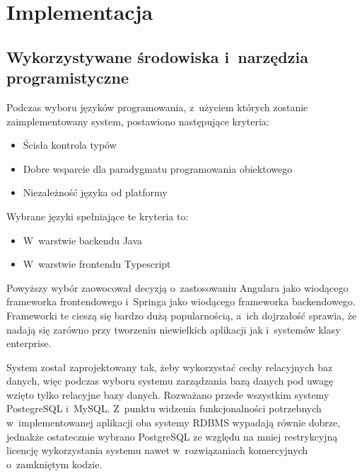 \chapter{Implementacja}\label{ch:implementation}
\section{Wykorzystywane środowiska i~narzędzia programistyczne}\label{sec:dev-tools}
Podczas wyboru języków programowania, z~użyciem których zostanie zaimplementowany system, postawiono następujące kryteria:

\begin{itemize}
    \item Ścisła kontrola typów
    \item Dobre wsparcie dla paradygmatu programowania obiektowego
    \item Niezależność języka od platformy
\end{itemize}

Wybrane języki spełniające te kryteria to:

\begin{itemize}
    \item W~warstwie backendu Java\cite{tech:java}
    \item W~warstwie frontendu Typescript\cite{tech:typescript}
\end{itemize}

Powyższy wybór zaowocował decyzją o~zastosowaniu Angulara\cite{tech:angular} jako wiodącego frameworka frontendowego
i~Springa\cite{tech:spring} jako wiodącego frameworka backendowego.
Frameworki te cieszą się bardzo dużą popularnością, a~ich dojrzałość sprawia,
że nadają się zarówno przy tworzeniu niewielkich aplikacji jak i~systemów klasy enterprise.

\par
{}

\par
System został zaprojektowany tak, żeby wykorzystać cechy relacyjnych baz danych,
więc podczas wyboru systemu zarządzania bazą danych pod uwagę wzięto tylko relacyjne bazy danych.
Rozważano przede wszystkim systemy PostegreSQL\cite{tech:postgresql} i~MySQL\cite{tech:mysql}.
Z~punktu widzenia funkcjonalności potrzebnych w~implementowanej aplikacji oba systemy RDBMS wypadają równie dobrze,
jednakże ostatecznie wybrano PostgreSQL ze względu na mniej restrykcyjną licencję wykorzystania systemu nawet w~rozwiązaniach komercyjnych o~zamkniętym kodzie.
\par
{}

